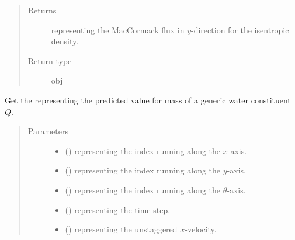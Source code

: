 \documentclass[letterpaper,10pt,english]{sphinxmanual}
\begin{document}
\begin{fulllineitems}
\begin{fulllineitems}
\begin{quote}
\begin{description}
\begin{itemize}
\end{itemize}

\item[{Returns}] \leavevmode
{} representing the MacCormack flux in \(y\)-direction for the isentropic density.

\item[{Return type}] \leavevmode
obj

\end{description}\end{quote}

\end{fulllineitems}


\begin{fulllineitems}
\label{\detokenize{api:dycore.flux_isentropic.FluxIsentropicMacCormack._get_maccormack_predicted_value_constituent}}
Get the  representing the predicted value for mass of a generic water constituent \(Q\).
\begin{quote}\begin{description}
\item[{Parameters}] \leavevmode\begin{itemize}
\item {} 
 () \textendash{}  representing the index running along the \(x\)-axis.

\item {} 
 () \textendash{}  representing the index running along the \(y\)-axis.

\item {} 
 () \textendash{}  representing the index running along the \(\theta\)-axis.

\item {} 
 () \textendash{}  representing the time step.

\item {} 
 () \textendash{}  representing the unstaggered \(x\)-velocity.


\end{itemize}
\end{description}
\end{quote}
\end{fulllineitems}
\end{fulllineitems}
\end{document}
